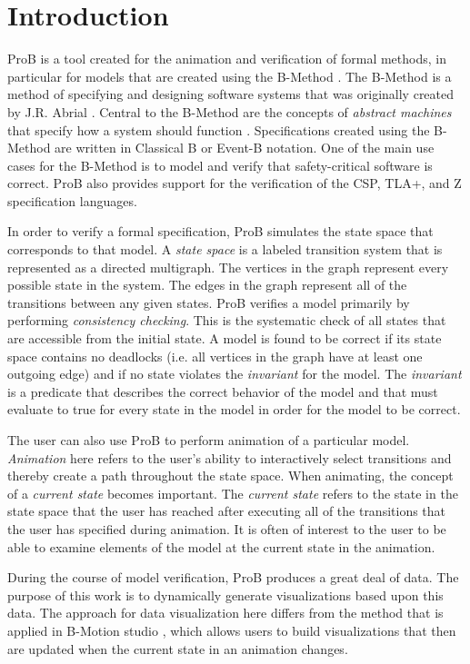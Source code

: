\section{Introduction}

ProB is a tool created for the animation and verification of formal methods, in particular for models that are created using the B-Method \cite{LeBu03_32}. The B-Method is a method of specifying and designing software systems that was originally created by J.R. Abrial \cite{abrial2005b}. Central to the B-Method are the concepts of \emph{abstract machines} that specify how a system should function \cite{schneider2001b}. Specifications created using the B-Method are written in Classical B or Event-B notation. One of the main use cases for the B-Method is to model and verify that safety-critical software is correct. ProB also provides support for the verification of the CSP, TLA+, and Z specification languages.

In order to verify a formal specification, ProB simulates the state space that corresponds to that model. A \emph{state space} is a labeled transition system that is represented as a directed multigraph. The vertices in the graph represent every possible state in the system. The edges in the graph represent all of the transitions between any given states. ProB verifies a model primarily by performing \emph{consistency checking}. This is the systematic check of all states that are accessible from the initial state. A model is found to be correct if its state space contains no deadlocks (i.e. all vertices in the graph have at least one outgoing edge) and if no state violates the \emph{invariant} for the model. The \emph{invariant} is a predicate that describes the correct behavior of the model and that must evaluate to true for every state in the model in order for the model to be correct. 

The user can also use ProB to perform animation of a particular model. \emph{Animation} here refers to the user's ability to interactively select transitions and thereby create a path throughout the state space. When animating, the concept of a \emph{current state} becomes important. The \emph{current state} refers to the state in the state space that the user has reached after executing all of the transitions that the user has specified during animation. It is often of interest to the user to be able to examine elements of the model at the current state in the animation.

During the course of model verification, ProB produces a great deal of data. The purpose of this work is to dynamically generate visualizations based upon this data. The approach for data visualization here differs from the method that is applied in B-Motion studio \cite{LaBeLe09_258}, which allows users to build visualizations that then are updated when the current state in an animation changes.

